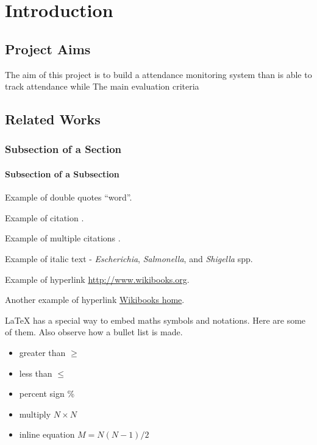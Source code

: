 \chapter{Introduction}
\section{Project Aims}

The aim of this project is to build a attendance monitoring system than is able to track attendance while 
The main evaluation criteria

\section{Related Works} 



\subsection{Subsection of a Section}
\subsubsection{Subsection of a Subsection}

Example of double quotes ``word''. 

Example of citation \citep{altschul1997gapped}.  

Example of multiple citations \citep{altschul1997gapped,baker2007novel}. 

Example of italic text - {\it Escherichia}, {\it Salmonella}, and {\it Shigella} spp. 

Example of hyperlink \url{http://www.wikibooks.org}. 

Another example of hyperlink \href{http://www.wikibooks.org}{Wikibooks home}. 

LaTeX{} has a special way to embed maths symbols and notations. Here are some of them. Also observe how a bullet list is made.

\begin{itemize}\itemsep0pt \parskip0pt 
\item greater than $\ge$
\item less than $\le$
\item percent sign \%
\item multiply $N\times N$
\item inline equation $M = N(N-1)/2$
\end{itemize}

